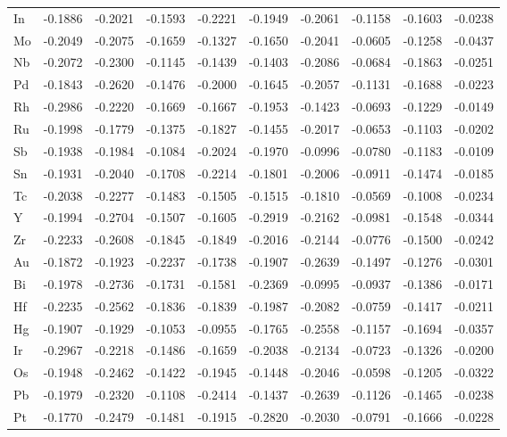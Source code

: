 \documentclass[a4paper, 12pt]{article}
\begin{document}
\begin{table}[htbp]
{\begin{tabular}{l *{9}{l}}
      In & -0.1886 & -0.2021 & -0.1593 & -0.2221 & -0.1949 & -0.2061 & -0.1158 & -0.1603 & -0.0238 \\
      Mo & -0.2049 & -0.2075 & -0.1659 & -0.1327 & -0.1650 & -0.2041 & -0.0605 & -0.1258 & -0.0437 \\
      Nb & -0.2072 & -0.2300 & -0.1145 & -0.1439 & -0.1403 & -0.2086 & -0.0684 & -0.1863 & -0.0251 \\
      Pd & -0.1843 & -0.2620 & -0.1476 & -0.2000 & -0.1645 & -0.2057 & -0.1131 & -0.1688 & -0.0223 \\
      Rh & -0.2986 & -0.2220 & -0.1669 & -0.1667 & -0.1953 & -0.1423 & -0.0693 & -0.1229 & -0.0149 \\
      Ru & -0.1998 & -0.1779 & -0.1375 & -0.1827 & -0.1455 & -0.2017 & -0.0653 & -0.1103 & -0.0202 \\
      Sb & -0.1938 & -0.1984 & -0.1084 & -0.2024 & -0.1970 & -0.0996 & -0.0780 & -0.1183 & -0.0109 \\
      Sn & -0.1931 & -0.2040 & -0.1708 & -0.2214 & -0.1801 & -0.2006 & -0.0911 & -0.1474 & -0.0185 \\
      Tc & -0.2038 & -0.2277 & -0.1483 & -0.1505 & -0.1515 & -0.1810 & -0.0569 & -0.1008 & -0.0234 \\
      Y  & -0.1994 & -0.2704 & -0.1507 & -0.1605 & -0.2919 & -0.2162 & -0.0981 & -0.1548 & -0.0344 \\
      Zr & -0.2233 & -0.2608 & -0.1845 & -0.1849 & -0.2016 & -0.2144 & -0.0776 & -0.1500 & -0.0242 \\
      Au & -0.1872 & -0.1923 & -0.2237 & -0.1738 & -0.1907 & -0.2639 & -0.1497 & -0.1276 & -0.0301 \\
      Bi & -0.1978 & -0.2736 & -0.1731 & -0.1581 & -0.2369 & -0.0995 & -0.0937 & -0.1386 & -0.0171 \\
      Hf & -0.2235 & -0.2562 & -0.1836 & -0.1839 & -0.1987 & -0.2082 & -0.0759 & -0.1417 & -0.0211 \\
      Hg & -0.1907 & -0.1929 & -0.1053 & -0.0955 & -0.1765 & -0.2558 & -0.1157 & -0.1694 & -0.0357 \\
      Ir & -0.2967 & -0.2218 & -0.1486 & -0.1659 & -0.2038 & -0.2134 & -0.0723 & -0.1326 & -0.0200 \\
      Os & -0.1948 & -0.2462 & -0.1422 & -0.1945 & -0.1448 & -0.2046 & -0.0598 & -0.1205 & -0.0322 \\
      Pb & -0.1979 & -0.2320 & -0.1108 & -0.2414 & -0.1437 & -0.2639 & -0.1126 & -0.1465 & -0.0238 \\
      Pt & -0.1770 & -0.2479 & -0.1481 & -0.1915 & -0.2820 & -0.2030 & -0.0791 & -0.1666 & -0.0228 \\

\end{tabular}}
\end{table}
\end{document}
